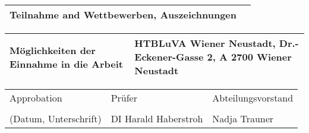 \begin{center}
\vspace{5mm}

\begin{tabular}{| m{8cm} | m{8cm} |}
    \hline
    Teilnahme and Wettbewerben, Auszeichnungen & \\ 
    \hline
\end{tabular}

\vspace{5mm}

\begin{tabular}{| m{8cm} | m{8cm} |}
    \hline
    Möglichkeiten der Einnahme in die Arbeit & HTBLuVA Wiener Neustadt, Dr.-Eckener-Gasse 2, A 2700 Wiener Neustadt\\
    \hline
\end{tabular}

\vspace{5mm}

\begin{tabular}{| m{5cm} | m{6cm} | m{5cm} |}
    \hline
    Approbation & Prüfer & Abteilungsvorstand\\
    &&\\
    (Datum, Unterschrift) & DI Harald Haberstroh & Nadja Trauner\\ %
    \hline
\end{tabular}

\end{center}


